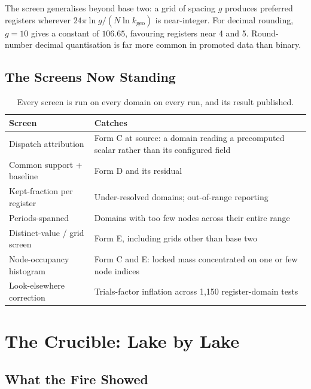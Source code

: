 \documentclass[11pt, letterpaper, openany]{book}
\newcommand{\kgeo}{k_{\mathrm{geo}}}
\begin{document}
The screen generalises beyond base two: a grid of spacing $g$ produces preferred registers
wherever $24\pi \ln g / (N \ln \kgeo)$ is near-integer. For decimal rounding, $g = 10$ gives a
constant of $106.65$, favouring registers near 4 and 5. Round-number decimal quantisation is far
more common in promoted data than binary.

\section{The Screens Now Standing}

\begin{table}[H]
\centering
\small
\begin{tabular}{@{}lp{}@{}}
\toprule
\textbf{Screen} & \textbf{Catches} \\
\midrule
Dispatch attribution & Form C at source: a domain reading a precomputed scalar rather than its configured field \\
Common support + baseline & Form D and its residual \\
Kept-fraction per register & Under-resolved domains; out-of-range reporting \\
Periods-spanned & Domains with too few nodes across their entire range \\
Distinct-value / grid screen & Form E, including grids other than base two \\
Node-occupancy histogram & Form C and E: locked mass concentrated on one or few node indices \\
Look-elsewhere correction & Trials-factor inflation across 1{,}150 register-domain tests \\
\bottomrule
\end{tabular}
\caption{Every screen is run on every domain on every run, and its result published.}
\end{table}

\chapter{The Crucible: Lake by Lake}

\section{What the Fire Showed}
\end{document}
